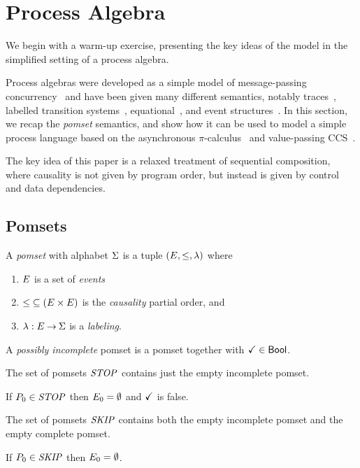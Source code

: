 \section{Process Algebra}

We begin with a warm-up exercise, presenting the key ideas of the
model in the simplified setting of a process algebra.

Process algebras were developed as a simple model of message-passing
concurrency~\cite{CCS,CSP,ACP} and have been given many different
semantics, notably traces~\cite{???}, labelled transition
systems~\cite{???}, equational~\cite{???}, and event
structures~\cite{???}.  In this section, we recap the \emph{pomset}
semantics, and show how it can be used to model a simple process
language based on the asynchronous $\pi$-calculus~\cite{???} and
value-passing CCS~\cite{???}.

The key idea of this paper is a relaxed treatment of sequential
composition, where causality is not given by program order, but
instead is given by control and data dependencies.

\subsection{Pomsets}

\begin{definition}
  A \emph{pomset} with alphabet $\Sigma$ is a tuple
  $(E, {\le}, \lambda)$ where
  \begin{enumerate}
  \item $E$ is a set of \emph{events}
  \item
    ${\le} \subseteq (E\times E)$ is the \emph{causality} partial order, and
  \item
    $\lambda: E \mathbin\rightarrow \Sigma$ is a \emph{labeling}.
  \end{enumerate}
\end{definition}

\begin{definition}
  A \emph{possibly incomplete} pomset is a pomset
  together with $\checkmark\in\mathsf{Bool}$.
\end{definition}

The set of pomsets $\mathit{STOP}$ contains just the empty incomplete pomset.
\begin{definition}
  If $P_0\in\mathit{STOP}$ then
  $E_0 = \emptyset$ and $\checkmark$ is false.
\end{definition}

The set of pomsets $\mathit{SKIP}$ contains both the empty incomplete pomset
and the empty complete pomset.
\begin{definition}
  If $P_0\in\mathit{SKIP}$ then
  $E_0 = \emptyset$.
\end{definition}

